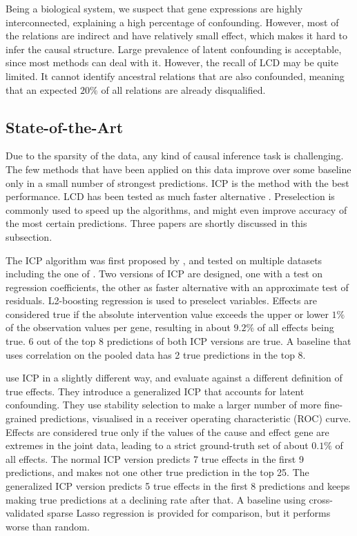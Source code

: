 Being a biological system, we suspect that gene expressions are highly interconnected, explaining a high percentage of confounding. However, most of the relations are indirect and have relatively small effect, which makes it hard to infer the causal structure. Large prevalence of latent confounding is acceptable, since most methods can deal with it. However, the recall of LCD may be quite limited. It cannot identify ancestral relations that are also confounded, meaning that an expected $20\%$ of all relations are already disqualified.


\subsection{State-of-the-Art}

Due to the sparsity of the data, any kind of causal inference task is challenging. The few methods that have been applied on this data improve over some baseline only in a small number of strongest predictions. ICP is the method with the best performance. LCD has been tested as much faster alternative \citep{versteeg2019boosting}. Preselection is commonly used to speed up the algorithms, and might even improve accuracy of the most certain predictions. Three papers are shortly discussed in this subsection.

The ICP algorithm was first proposed by \textbf{\citet{peters2016causal}}, and tested on multiple datasets including the one of \citet{kemmeren2014large}. Two versions of ICP are designed, one with a test on regression coefficients, the other as faster alternative with an approximate test of residuals. L2-boosting regression \citep{schapire1998boosting} is used to preselect variables. Effects are considered true if the absolute intervention value exceeds the upper or lower $1\%$ of the observation values per gene, resulting in about $9.2\%$ of all effects being true. 6 out of the top 8 predictions of both ICP versions are true. A baseline that uses correlation on the pooled data has 2 true predictions in the top 8.

\textbf{\citet{meinshausen2016methods}} use ICP in a slightly different way, and evaluate against a different definition of true effects. They introduce a generalized ICP that accounts for latent confounding. They use stability selection \citep{meinshausen2010stability} to make a larger number of more fine-grained predictions, visualised in a receiver operating characteristic (ROC) curve. Effects are considered true only if the values of the cause and effect gene are extremes in the joint data, leading to a strict ground-truth set of about $0.1\%$ of all effects. The normal ICP version predicts 7 true effects in the first 9 predictions, and makes not one other true prediction in the top 25. The generalized ICP version predicts 5 true effects in the first 8 predictions and keeps making true predictions at a declining rate after that. A baseline using cross-validated sparse Lasso regression is provided for comparison, but it performs worse than random.

